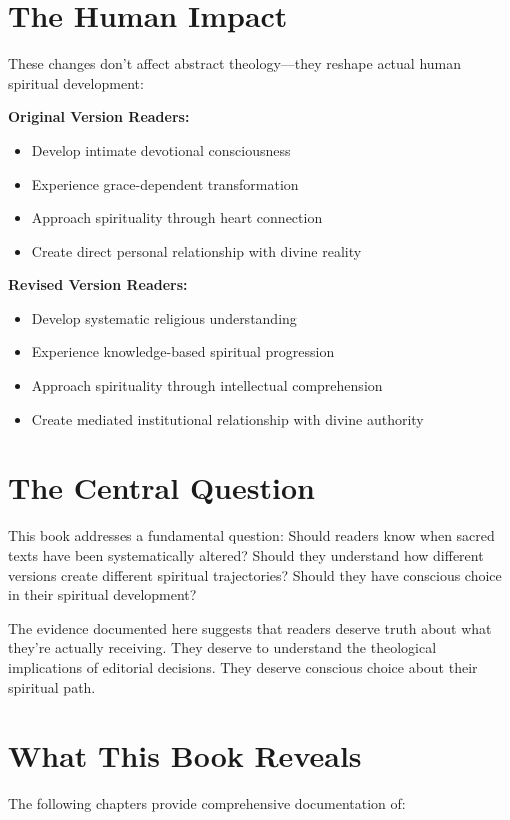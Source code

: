 \documentclass[11pt,twoside]{book}
\begin{document}
\section*{The Human Impact}
\label{sec:orgf042ef7}

These changes don't affect abstract theology—they reshape actual human spiritual development:

\textbf{\textbf{Original Version Readers:}}
\begin{itemize}
\item Develop intimate devotional consciousness
\item Experience grace-dependent transformation
\item Approach spirituality through heart connection
\item Create direct personal relationship with divine reality
\end{itemize}

\textbf{\textbf{Revised Version Readers:}}
\begin{itemize}
\item Develop systematic religious understanding
\item Experience knowledge-based spiritual progression
\item Approach spirituality through intellectual comprehension
\item Create mediated institutional relationship with divine authority
\end{itemize}
\section*{The Central Question}
\label{sec:org5f8d76f}

This book addresses a fundamental question: Should readers know when sacred texts have been systematically altered? Should they understand how different versions create different spiritual trajectories? Should they have conscious choice in their spiritual development?

The evidence documented here suggests that readers deserve truth about what they're actually receiving. They deserve to understand the theological implications of editorial decisions. They deserve conscious choice about their spiritual path.
\section*{What This Book Reveals}
\label{sec:orgf49c847}

The following chapters provide comprehensive documentation of:
\end{document}
